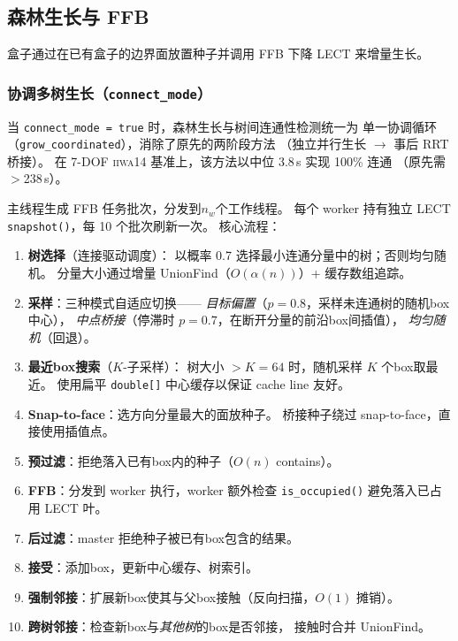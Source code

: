 \documentclass[journal]{IEEEtran}
\begin{document}
\subsection{森林生长与 FFB}\label{sec:forest_growth}

盒子通过在已有盒子的边界面放置种子并调用 FFB 下降 LECT 来增量生长。

\subsubsection{协调多树生长（\texttt{connect\_mode}）}

当 \texttt{connect\_mode = true} 时，森林生长与树间连通性检测统一为
单一协调循环（\texttt{grow\_coordinated}），消除了原先的两阶段方法
（独立并行生长 $\to$ 事后 RRT 桥接）。
在 7-DOF \textsc{iiwa14} 基准上，该方法以中位 3.8\,s 实现 100\% 连通
（原先需 $>$238\,s）。

主线程生成 FFB 任务批次，分发到$n_w$个工作线程。
每个 worker 持有独立 LECT \texttt{snapshot()}，每 10 个批次刷新一次。
核心流程：

\begin{enumerate}[nosep]
  \item \textbf{树选择}（连接驱动调度）：
    以概率 0.7 选择最小连通分量中的树；否则均匀随机。
    分量大小通过增量 UnionFind（$O(\alpha(n))$）+ 缓存数组追踪。

  \item \textbf{采样}：三种模式自适应切换——
    \emph{目标偏置}（$p = 0.8$，采样未连通树的随机box中心），
    \emph{中点桥接}（停滞时 $p = 0.7$，在断开分量的前沿box间插值），
    \emph{均匀随机}（回退）。

  \item \textbf{最近box搜索}（$K$-子采样）：
    树大小 $> K = 64$ 时，随机采样 $K$ 个box取最近。
    使用扁平 \texttt{double[]} 中心缓存以保证 cache line 友好。

  \item \textbf{Snap-to-face}：选方向分量最大的面放种子。
    桥接种子绕过 snap-to-face，直接使用插值点。

  \item \textbf{预过滤}：拒绝落入已有box内的种子（$O(n)$ contains）。

  \item \textbf{FFB}：分发到 worker 执行，worker 额外检查
    \texttt{is\_occupied()} 避免落入已占用 LECT 叶。

  \item \textbf{后过滤}：master 拒绝种子被已有box包含的结果。

  \item \textbf{接受}：添加box，更新中心缓存、树索引。

  \item \textbf{强制邻接}：扩展新box使其与父box接触（反向扫描，$O(1)$ 摊销）。

  \item \textbf{跨树邻接}：检查新box与\emph{其他树}的box是否邻接，
    接触时合并 UnionFind。
\end{enumerate}
\end{document}
